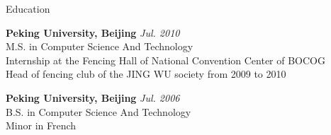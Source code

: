 \documentclass{resume} %
\begin{document}


\begin{rSection}{Education}

{\bf Peking University, Beijing} \hfill {\em Jul. 2010} \\ 
M.S. in Computer Science And Technology \\
Internship at the Fencing Hall of National Convention Center of BOCOG \\
Head of fencing club of the JING WU society from 2009 to 2010 

{\bf Peking University, Beijing} \hfill {\em Jul. 2006} \\ 
B.S. in Computer Science And Technology \\
Minor in French

\end{rSection}






\end{document}
